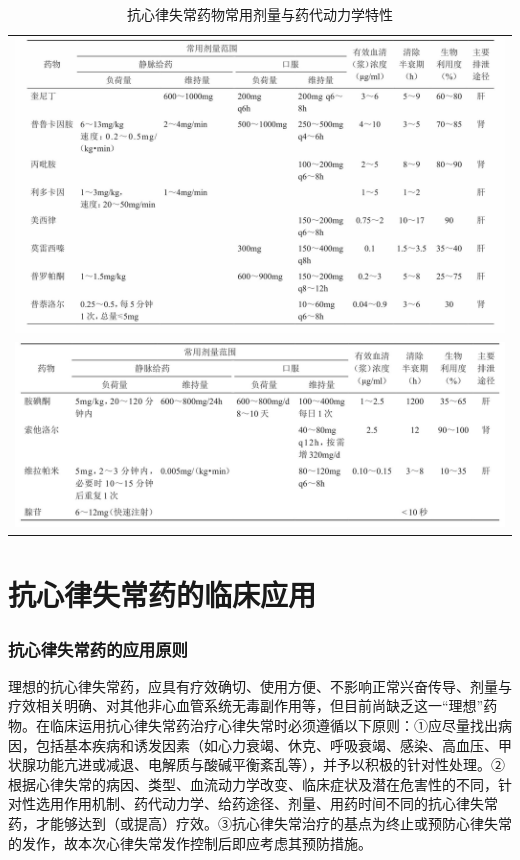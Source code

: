 \begin{longtable}{c}
 \caption{抗心律失常药物常用剂量与药代动力学特性}
 \label{tab151-4}
 \endfirsthead
 \caption[]{抗心律失常药物常用剂量与药代动力学特性}
 \endhead
 \includegraphics[width=\textwidth,height=\textheight,keepaspectratio]{./images/Image00572.jpg}\\
 \includegraphics[width=\textwidth,height=\textheight,keepaspectratio]{./images/Image00573.jpg}
 \end{longtable}

\protect\hypertarget{text00422.html}{}{}

\section{抗心律失常药的临床应用}

\subsubsection{抗心律失常药的应用原则}

理想的抗心律失常药，应具有疗效确切、使用方便、不影响正常兴奋传导、剂量与疗效相关明确、对其他非心血管系统无毒副作用等，但目前尚缺乏这一“理想”药物。在临床运用抗心律失常药治疗心律失常时必须遵循以下原则：①应尽量找出病因，包括基本疾病和诱发因素（如心力衰竭、休克、呼吸衰竭、感染、高血压、甲状腺功能亢进或减退、电解质与酸碱平衡紊乱等），并予以积极的针对性处理。②根据心律失常的病因、类型、血流动力学改变、临床症状及潜在危害性的不同，针对性选用作用机制、药代动力学、给药途径、剂量、用药时间不同的抗心律失常药，才能够达到（或提高）疗效。③抗心律失常治疗的基点为终止或预防心律失常的发作，故本次心律失常发作控制后即应考虑其预防措施。

